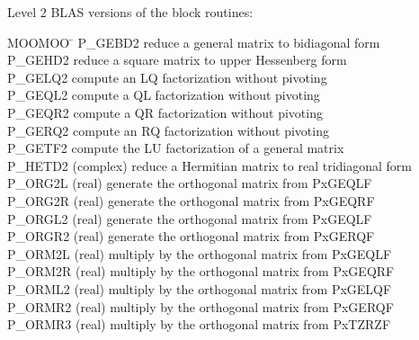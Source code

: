 \documentclass[11pt]{report}
\begin{document}
\noindent
Level 2 BLAS versions of the block routines:
\begin{tabbing}
MOOMOO \= \kill
P\_GEBD2 \> reduce a general matrix to bidiagonal form \\
P\_GEHD2 \> reduce a square matrix to upper Hessenberg form \\
P\_GELQ2 \> compute an LQ factorization without pivoting \\
P\_GEQL2 \> compute a QL factorization without pivoting \\
P\_GEQR2 \> compute a QR factorization without pivoting \\
P\_GERQ2 \> compute an RQ factorization without pivoting \\
P\_GETF2 \> compute the LU factorization of a general matrix \\
P\_HETD2 \> (complex) reduce a Hermitian matrix to real tridiagonal form \\
P\_ORG2L \> (real) generate the orthogonal matrix from PxGEQLF \\
P\_ORG2R \> (real) generate the orthogonal matrix from PxGEQRF \\
P\_ORGL2 \> (real) generate the orthogonal matrix from PxGEQLF \\
P\_ORGR2 \> (real) generate the orthogonal matrix from PxGERQF \\
P\_ORM2L \> (real) multiply by the orthogonal matrix from PxGEQLF \\
P\_ORM2R \> (real) multiply by the orthogonal matrix from PxGEQRF \\
P\_ORML2 \> (real) multiply by the orthogonal matrix from PxGELQF \\
P\_ORMR2 \> (real) multiply by the orthogonal matrix from PxGERQF \\
P\_ORMR3 \> (real) multiply by the orthogonal matrix from PxTZRZF \\

\end{tabbing}
\end{document}
